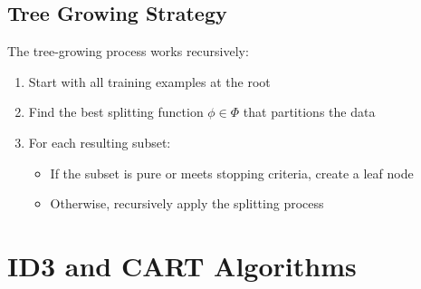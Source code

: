 \documentclass[a4paper]{article}
\theoremstyle{definition}
\begin{document}
\subsection{Tree Growing Strategy}
The tree-growing process works recursively:
\begin{enumerate}
    \item Start with all training examples at the root 
    \item Find the best splitting function \( \phi \in \Phi \) that partitions the data
    \item For each resulting subset:
    \begin{itemize}
        \item If the subset is pure or meets stopping criteria, create a leaf node 
        \item Otherwise, recursively apply the splitting process
    \end{itemize}
\end{enumerate}
\section{ID3 and CART Algorithms}
\end{document}
